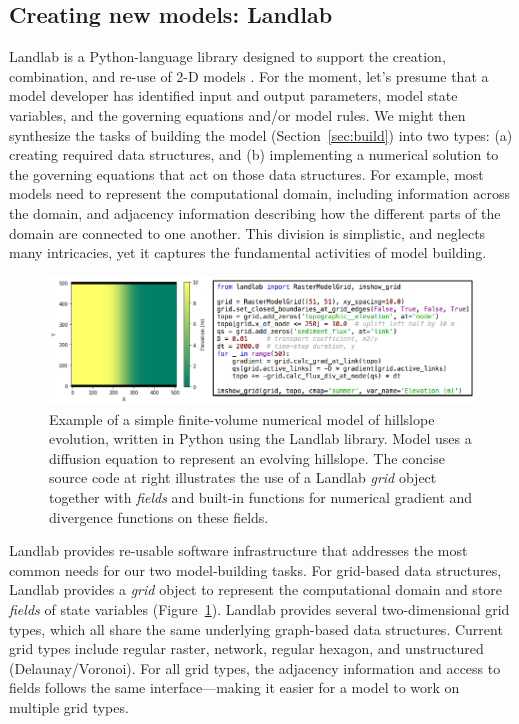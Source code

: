 \documentclass{article} %
\begin{document}
\subsection{Creating new models: Landlab}

Landlab is a Python-language library designed to support the creation, combination, and re-use of 2-D models \citep{hobley2017creative, barnhart2020short}. For the moment, let's presume that a model developer has identified input and output parameters, model state variables, and the governing equations and/or model rules. We might then synthesize the tasks of building the model (Section~\ref{sec:build}) into two types: (a) creating required data structures, and (b) implementing a numerical solution to the governing equations that act on those data structures. For example, most models need to represent the computational domain, including information  across the domain, and adjacency information describing how the different parts of the domain are connected to one another. This division is simplistic, and neglects many intricacies, yet it captures the fundamental activities of model building. 

\begin{figure}[h!]
\centering
\includegraphics{Figures/simple_landlab_diffusion_model.pdf}
\caption{Example of a simple finite-volume numerical model of hillslope evolution, written in Python using the Landlab library. Model uses a diffusion equation to represent an evolving hillslope. The concise source code at right illustrates the use of a Landlab \textit{grid} object together with \textit{fields} and built-in functions for numerical gradient and divergence functions on these fields.}
\label{fig:landlabdiffusion}
\end{figure}


Landlab provides re-usable software infrastructure that addresses the most common needs for our two model-building tasks. For grid-based data structures, Landlab provides a \textit{grid} object to represent the computational domain and store \textit{fields} of state variables (Figure~\ref{fig:landlabdiffusion}). Landlab provides several two-dimensional grid types, which all share the same underlying graph-based data structures. Current grid types include regular raster, network, regular hexagon, and unstructured (Delaunay/Voronoi). For all grid types, the adjacency information and access to fields follows the same interface---making it easier for a model to work on multiple grid types.
\end{document}
